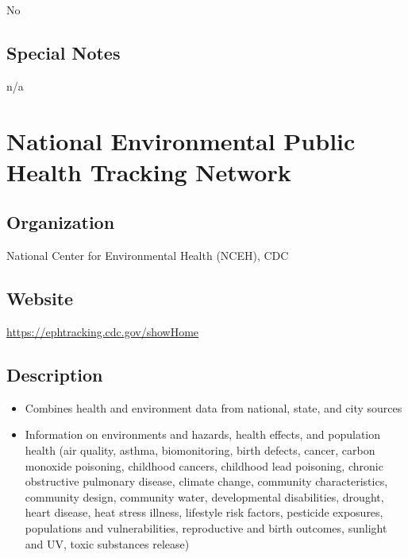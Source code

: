 \documentclass[
]{book}
\providecommand{\tightlist}{%
  \setlength{\itemsep}{0pt}\setlength{\parskip}{0pt}}
\begin{document}
No

\hypertarget{special-notes-46}{%
\section{Special Notes}\label{special-notes-46}}

n/a

\mainmatter

\hypertarget{national-environmental-public-health-tracking-network}{%
\chapter{National Environmental Public Health Tracking Network}\label{national-environmental-public-health-tracking-network}}

\hypertarget{organization-47}{%
\section{Organization}\label{organization-47}}

National Center for Environmental Health (NCEH), CDC

\hypertarget{website-47}{%
\section{Website}\label{website-47}}

\url{https://ephtracking.cdc.gov/showHome}

\hypertarget{description-47}{%
\section{Description}\label{description-47}}

\begin{itemize}
\tightlist
\item
  Combines health and environment data from national, state, and city sources
\item
  Information on environments and hazards, health effects, and population health (air quality, asthma, biomonitoring, birth defects, cancer, carbon monoxide poisoning, childhood cancers, childhood lead poisoning, chronic obstructive pulmonary disease, climate change, community characteristics, community design, community water, developmental disabilities, drought, heart disease, heat stress illness, lifestyle risk factors, pesticide exposures, populations and vulnerabilities, reproductive and birth outcomes, sunlight and UV, toxic substances release)
\end{itemize}
\end{document}
